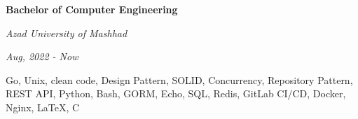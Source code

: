 \documentclass{engineercv}
\begin{document}
\begin{minipage}{\textwidth}
  \begin{multicols}{2}
    \begin{minipage}{0.5\textwidth}
      \textbf{Bachelor of Computer Engineering}

      \textit{Azad University of Mashhad}

      \textit{Aug, 2022 - Now}
    \end{minipage}
    \columnbreak
    \begin{minipage}{0.5\textwidth}
      Go, Unix, clean code, Design Pattern, SOLID, Concurrency, Repository Pattern,
      REST API, Python, Bash, GORM, Echo, SQL, Redis, GitLab CI/CD, Docker,
      Nginx, \LaTeX, C
    \end{minipage}
  \end{multicols}
\end{minipage}
\end{document}
